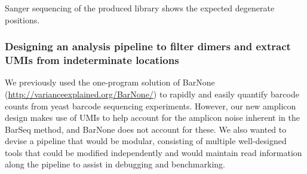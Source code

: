   {Sanger sequencing of the produced library shows the expected
  degenerate positions.}

\subsubsection{Designing an analysis pipeline to filter dimers and 
extract UMIs from indeterminate locations}

We previously used the one-program solution of BarNone 
(\url{http://varianceexplained.org/BarNone/})
to rapidly and easily quantify barcode counts from yeast barcode
sequencing experiments. However, our new amplicon design makes use of
UMIs to help account for the amplicon noise inherent in the BarSeq
method, and BarNone does not account for these. We also wanted to devise
a pipeline that would be modular, consisting of multiple well-designed
tools that could be modified independently and would maintain read
information along the pipeline to assist in debugging and benchmarking.

